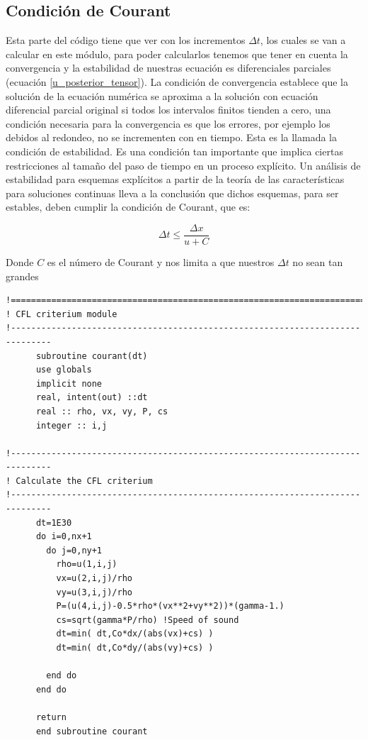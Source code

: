 \documentclass[12pt,a4paper]{book}
\begin{document}
\subsection{Condición de Courant}
Esta parte del código tiene que ver con los incrementos $\Delta t$, los cuales se van a calcular en este módulo, para poder calcularlos tenemos que tener en cuenta la convergencia y la estabilidad de nuestras ecuación  es diferenciales parciales (ecuación \ref{u_posterior_tensor}). La condición de convergencia establece que la solución de la ecuación numérica se aproxima a la solución con ecuación diferencial parcial original si todos los intervalos finitos tienden a cero, una condición necesaria para la convergencia es que los errores, por ejemplo los debidos al redondeo, no se incrementen con en tiempo. Esta es la llamada la condición de estabilidad. Es una condición tan importante que implica ciertas restricciones al tamaño del paso de tiempo en un proceso explícito. Un análisis de estabilidad para esquemas explícitos a partir de la teoría de las características para soluciones continuas lleva a la conclusión que dichos esquemas, para ser estables, deben cumplir la condición de Courant, que es: 

\begin{equation}
\Delta t \leq \frac{\Delta x}{u+C}
\end{equation}

Donde $C$ es el número de Courant y nos limita a que nuestros $\Delta t$ no sean tan grandes
\begin{lstlisting}[frame=single]
!==============================================================================
! CFL criterium module
!------------------------------------------------------------------------------
      subroutine courant(dt)
      use globals
      implicit none
      real, intent(out) ::dt
      real :: rho, vx, vy, P, cs
      integer :: i,j

!------------------------------------------------------------------------------
! Calculate the CFL criterium
!------------------------------------------------------------------------------
      dt=1E30
      do i=0,nx+1
        do j=0,ny+1
          rho=u(1,i,j)
          vx=u(2,i,j)/rho
          vy=u(3,i,j)/rho
          P=(u(4,i,j)-0.5*rho*(vx**2+vy**2))*(gamma-1.)
          cs=sqrt(gamma*P/rho) !Speed of sound
          dt=min( dt,Co*dx/(abs(vx)+cs) )
          dt=min( dt,Co*dy/(abs(vy)+cs) )

        end do
      end do

      return
      end subroutine courant

\end{lstlisting}
\end{document}
